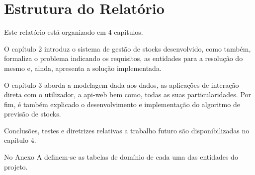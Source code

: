 %
%
\section{Estrutura do Relatório} \label{sec14}
Este relatório está organizado em 4 capítulos.

O capítulo 2 introduz o sistema de gestão de stocks desenvolvido, como também, formaliza o problema indicando os requisitos, as entidades para a resolução do mesmo e, ainda, apresenta a solução implementada.

O capítulo 3 aborda a modelagem dada aos dados, as aplicações de interação direta com o utilizador, a \gls{api-web} bem como, todas as suas particularidades. Por fim, é também explicado o desenvolvimento e implementação do algoritmo de previsão de stocks.

Conclusões, testes e diretrizes relativas a trabalho futuro são disponibilizadas no capítulo 4.

No Anexo A definem-se as tabelas de domínio de cada uma das entidades do projeto.